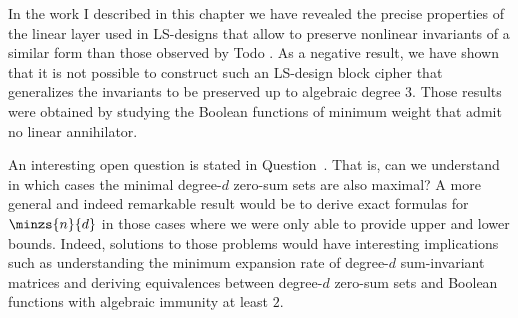 
In the work I described in this chapter we have revealed the precise properties of the linear layer used in LS-designs that allow to preserve nonlinear invariants of a similar form than those observed by Todo \etal. As a negative result, we have shown that it is not possible to construct such an LS-design block cipher that generalizes the invariants to be preserved up to algebraic degree $3$. Those results were obtained by studying the Boolean functions of minimum weight that admit no linear annihilator.

An interesting open question is stated in Question~. That is, can we understand in which cases the minimal degree-$d$ zero-sum sets are also maximal? A more general and indeed remarkable result would be to derive exact formulas for $\minzs{n}{d}$ in those cases where we were only able to provide upper and lower bounds. Indeed, solutions to those problems would have interesting implications such as understanding the minimum expansion rate of degree-$d$ sum-invariant matrices and deriving equivalences between degree-$d$ zero-sum sets and Boolean functions with algebraic immunity at least $2$.